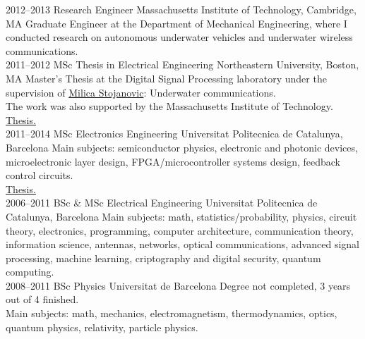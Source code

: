 \documentclass[]{friggeri-cv} %
\begin{document}
\begin{entrylist}


\entry
{2012--2013}
{Research Engineer}
{Massachusetts Institute of Technology, Cambridge, MA}
{Graduate Engineer at the Department of Mechanical Engineering,
  where I conducted research on autonomous underwater vehicles and
  underwater wireless communications.}\\


\entry
{2011--2012}
{MSc Thesis in Electrical Engineering}
{Northeastern University, Boston, MA}
{Master's Thesis at the Digital Signal Processing laboratory under the
  supervision of \href{http://millitsa.coe.neu.edu/}{Milica
    Stojanovic}: Underwater communications.\\
  The work was also supported by the Massachusetts Institute of
  Technology.\\
  \href{https://eos.ucs.uri.edu/seagrant_Linked_Documents/mit/mity12003.pdf}{{\FA \faExternalLink} Thesis.}
}\\

\entry
{2011--2014}
{MSc Electronics Engineering}
{Universitat Politecnica de Catalunya, Barcelona}
{Main subjects: semiconductor physics, electronic and photonic
  devices, microelectronic layer design, FPGA/microcontroller systems
  design, feedback control circuits.\\
  \href{http://upcommons.upc.edu/handle/2117/97991}{{\FA \faExternalLink} Thesis.}
}\\


\entry
{2006--2011}
{BSc \& MSc Electrical Engineering}
{Universitat Politecnica de Catalunya, Barcelona}
{Main subjects: math, statistics/probability, physics, circuit theory,
  electronics, programming, computer architecture, communication
  theory, information science, antennas, networks, optical
  communications, advanced signal processing, machine learning,
  criptography and digital security, quantum computing.
}\\


\entry
{2008--2011}
{BSc Physics}
{Universitat de Barcelona}
{Degree not completed, 3 years out of 4 finished.\\
Main subjects: math, mechanics, electromagnetism, thermodynamics,
optics, quantum physics, relativity, particle physics.
}


\end{entrylist}
\end{document}

